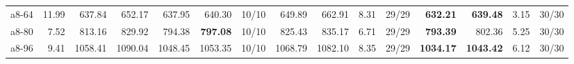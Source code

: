 \documentclass[aspectratio=1610]{beamer}
\begin{document}
\begin{frame}[noframenumbering]
\begin{table}[]
{\begin{tabular}{lrrrrrrrrrrrrrr}
a8-64                                          & 11.99                                                        & 637.84  & \multicolumn{1}{r|}{652.17}   & 637.95          & 640.30                                 & \multicolumn{1}{r|}{10/10} & 649.89        & 662.91         & 8.31         & \multicolumn{1}{r|}{29/29}       & \textbf{632.21}     & {\color[HTML]{FE0000} \textbf{639.48}}    & 3.15     & 30/30   \\
a8-80                                          & 7.52                                                         & 813.16  & \multicolumn{1}{r|}{829.92}   & 794.38          & {\color[HTML]{FE0000} \textbf{797.08}} & \multicolumn{1}{r|}{10/10} & 825.43        & 835.17         & 6.71         & \multicolumn{1}{r|}{29/29}       & \textbf{793.39}     & {\color[HTML]{000000} 802.36}             & 5.25     & 30/30   \\
a8-96                                          & 9.41                                                         & 1058.41 & \multicolumn{1}{r|}{1090.04}  & 1048.45         & 1053.35                                & \multicolumn{1}{r|}{10/10} & 1068.79       & 1082.10        & 8.35         & \multicolumn{1}{r|}{29/29}       & \textbf{1034.17}    & {\color[HTML]{FE0000} \textbf{1043.42}}   & 6.12     & 30/30   \\ \hline
\end{tabular}%
}
\end{table}

\end{frame}
\end{document}
